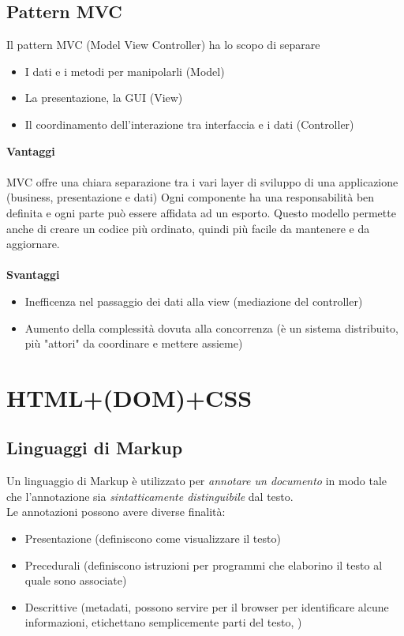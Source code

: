 \documentclass[12pt, a4paper]{article}
\begin{document}
    \subsection{Pattern MVC}
    Il pattern MVC (Model View Controller) ha lo scopo di separare
    \begin{itemize}
        \item I dati e i metodi per manipolarli (Model)
        \item La presentazione, la GUI (View)
        \item Il coordinamento dell'interazione tra interfaccia e i dati (Controller)
    \end{itemize}
    \textbf{Vantaggi}
    \\\\MVC offre una chiara separazione tra i vari layer di sviluppo di una applicazione (business, presentazione e dati)
    Ogni componente ha una responsabilità ben definita e ogni parte può essere affidata ad un esporto.
    Questo modello permette anche di creare un codice più ordinato, quindi più facile da mantenere e da aggiornare.
    \\\\
    \textbf{Svantaggi}
    \begin{itemize}
        \item Inefficenza nel passaggio dei dati alla view (mediazione del controller)
        \item Aumento della complessità dovuta alla concorrenza (è un sistema distribuito, più "attori" da coordinare e mettere assieme)
    \end{itemize}



    \newpage
    \section{HTML+(DOM)+CSS}
    \subsection{Linguaggi di Markup}
    Un linguaggio di Markup è utilizzato per \textit{annotare un documento} in modo 
    tale che l'annotazione sia \textit{sintatticamente distinguibile} dal testo.
    \\Le annotazioni possono avere diverse finalità:
    \begin{itemize}
        \item Presentazione (definiscono come visualizzare il testo)
        \item Precedurali (definiscono istruzioni per programmi che elaborino il testo al quale sono associate)
        \item Descrittive (metadati, possono servire per il browser per identificare alcune informazioni, etichettano semplicemente parti del testo, )
    \end{itemize}
\end{document}
